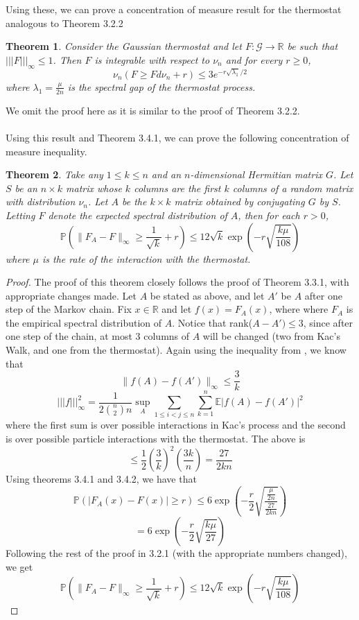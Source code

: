 \documentclass[12pt]{report}
\newtheorem{thm}{Theorem}[section]
\newcommand{\tripNorm}[1]{|||#1|||_\infty}
\theoremstyle{definition}
\begin{document}
Using these, we can prove a concentration of measure result for the thermostat analogous to Theorem 3.2.2
\begin{thm} Consider the Gaussian thermostat and let $F:\mathcal{G}\rightarrow\mathbb{R}$ be such that $\tripNorm{F}\leq 1$.  Then $F$ is integrable with respect to $\nu_n$ and for every $r\geq 0$, 
$$
\nu_n(F\geq Fd\nu_n+r)\leq 3e^{-r\sqrt{\lambda_1}/2}
$$
where $\lambda_1=\frac{\mu}{2n}$ is the spectral gap of the thermostat process.  
\end{thm}
We omit the proof here as it is similar to the proof of Theorem 3.2.2.  \\ \\
Using this result and Theorem 3.4.1, we can prove the following concentration of measure inequality.  
\begin{thm}
Take any $1\leq k\leq n$ and an $n$-dimensional Hermitian matrix $G$.  Let $S$ be an $n\times k$ matrix whose $k$ columns are the first $k$ columns of a random matrix with distribution $\nu_n$.  Let $A$ be the $k\times k$ matrix obtained by conjugating $G$ by $S$.  Letting $F$ denote the expected spectral distribution of $A$, then for each $r>0$, 
$$
\mathbb{P}(\|F_A-F\|_{\infty}\geq \frac{1}{\sqrt{k}}+r)\leq 12\sqrt{k}\exp\left(-r\sqrt{\frac{k\mu}{108}}\right)
$$ where $\mu$ is the rate of the interaction with the thermostat.  
\end{thm}

\begin{proof}
The proof of this theorem closely follows the proof of Theorem 3.3.1, with appropriate changes made.  Let $A$ be stated as above, and let $A'$ be $A$ after one step of the Markov chain.  Fix $x\in\mathbb{R}$ and let $f(x)=F_A(x)$, where where $F_A$ is the empirical spectral distribution of $A$.  Notice that rank($A-A')\leq 3$, since after one step of the chain, at most 3 columns of $A$ will be changed (two from Kac's Walk, and one from the thermostat).  Again using the inequality from \cite{Bai}, we know that 
$$
\|f(A)-f(A')\|_{\infty}\leq\frac{3}{k}
$$
$$
\tripNorm{f}^2 =\frac{1}{2{n\choose 2}{n}}\sup_A\sum_{1\leq i <j\leq n} \sum_{k=1}^n\mathbb{E}|f(A)-f(A')|^2
$$
where the first sum is over possible interactions in Kac's process and the second is over possible particle interactions with the thermostat.  The above is 
$$
\leq \frac{1}{2}\left(\frac{3}{k}\right)^2\left(\frac{3k}{n}\right)=\frac{27}{2kn}
$$
Using theorems 3.4.1 and 3.4.2, we have that 
$$
\mathbb{P}(|F_A(x)-F(x)|\geq r)\leq 6\exp\left(-\frac{r}{2}\sqrt{\frac{\frac{\mu}{2n}}{\frac{27}{2kn}}}\right)
$$
$$
=6\exp\left(-\frac{r}{2}\sqrt{\frac{k\mu}{27}}\right)
$$
Following the rest of the proof in 3.2.1 (with the appropriate numbers changed), we get 
$$
\mathbb{P}(\|F_A-F\|_{\infty}\geq \frac{1}{\sqrt{k}}+r)\leq 12\sqrt{k}\exp\left(-r\sqrt{\frac{k\mu}{108}}\right)
$$
\end{proof}
\end{document}
